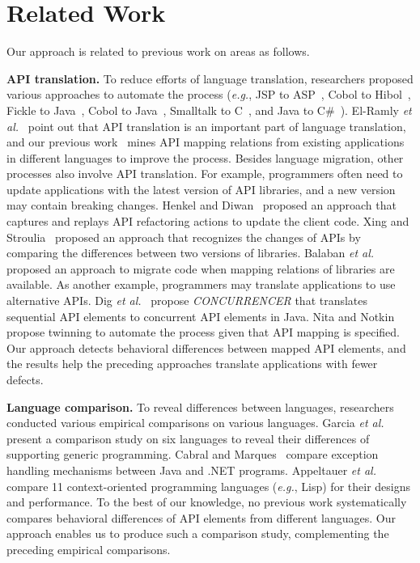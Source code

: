 \section{Related Work}
\label{sec:related}

Our approach is related to previous work on areas as follows.

\textbf{API translation.} To reduce efforts of language translation, researchers proposed various
approaches to automate the process (\emph{e.g.}, JSP to ASP~\cite{hassan2005lightweight}, Cobol to Hibol~\cite{waters1988program}, Fickle to Java~\cite{ancona2007provenly}, Cobol to Java~\cite{mossienko2003automated}, Smalltalk to C~\cite{yasumatsu1995spice}, and Java to C\#~\cite{el2006experiment}). El-Ramly \emph{et al.}~\cite{el2006experiment} point out that API translation is an important part of language translation, and our previous work~\cite{zhong2010mining} mines API mapping relations from existing applications in different languages to improve the process. Besides language migration, other processes also involve API translation. For example, programmers often need to update applications with the latest version of API libraries, and a new version may contain breaking changes. Henkel and Diwan~\cite{henkel2005catchup} proposed an approach that captures and replays API refactoring actions to update the client code. Xing and Stroulia~\cite{xing2007api} proposed an approach that recognizes the changes of APIs by comparing the differences between two versions of libraries. Balaban \emph{et al.}~\cite{balaban2005refactoring} proposed an approach to migrate code when mapping relations of libraries are available. As another example, programmers may translate applications to use alternative APIs. Dig \emph{et al.}~\cite{dig2009refactoring} propose \emph{CONCURRENCER} that translates sequential API elements to concurrent API elements in Java. Nita and Notkin~\cite{nita2010using} propose twinning to automate the process given that API mapping is specified. Our approach detects behavioral differences between mapped API elements, and the results help the preceding approaches translate applications with fewer defects.

\textbf{Language comparison.} To reveal differences between languages, researchers conducted various empirical comparisons on various languages. Garcia \emph{et al.}~\cite{Garcia2003} present a comparison study on six languages to reveal their differences of supporting generic programming. Cabral and Marques~\cite{cabral2007exception} compare exception handling mechanisms between Java and .NET programs. Appeltauer \emph{et al.}~\cite{appeltauer2009comparison} compare 11 context-oriented programming languages (\emph{e.g.}, Lisp) for their designs and performance. To the best of our knowledge, no previous work systematically compares behavioral differences of API elements from different languages. Our approach enables us to produce such a comparison study, complementing the preceding empirical comparisons.

